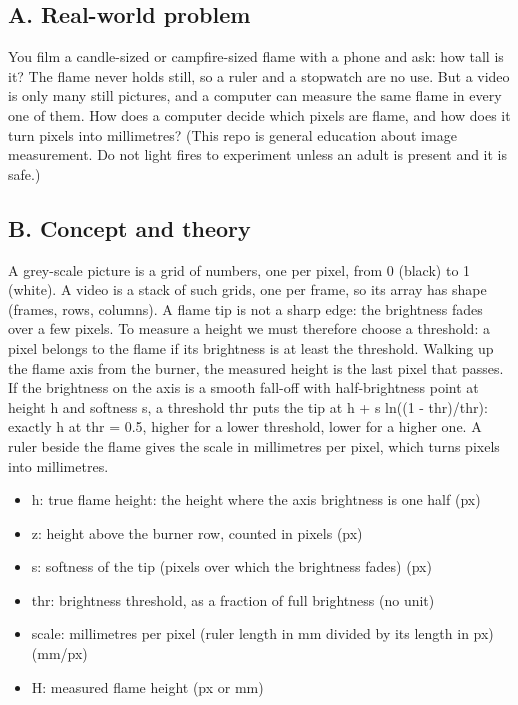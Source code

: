 \documentclass[11pt,a4paper]{article}
\begin{document}
\subsection*{A. Real-world problem}
You film a candle-sized or campfire-sized flame with a phone and ask: how tall is it? The flame never holds still, so a ruler and a stopwatch are no use. But a video is only many still pictures, and a computer can measure the same flame in every one of them. How does a computer decide which pixels are flame, and how does it turn pixels into millimetres? (This repo is general education about image measurement. Do not light fires to experiment unless an adult is present and it is safe.)

\subsection*{B. Concept and theory}
A grey-scale picture is a grid of numbers, one per pixel, from 0 (black) to 1 (white). A video is a stack of such grids, one per frame, so its array has shape (frames, rows, columns). A flame tip is not a sharp edge: the brightness fades over a few pixels. To measure a height we must therefore choose a threshold: a pixel belongs to the flame if its brightness is at least the threshold. Walking up the flame axis from the burner, the measured height is the last pixel that passes. If the brightness on the axis is a smooth fall-off with half-brightness point at height h and softness s, a threshold thr puts the tip at h + s ln((1 - thr)/thr): exactly h at thr = 0.5, higher for a lower threshold, lower for a higher one. A ruler beside the flame gives the scale in millimetres per pixel, which turns pixels into millimetres.

\begin{itemize}[nosep]
\item h: true flame height: the height where the axis brightness is one half (px)
\item z: height above the burner row, counted in pixels (px)
\item s: softness of the tip (pixels over which the brightness fades) (px)
\item thr: brightness threshold, as a fraction of full brightness (no unit)
\item scale: millimetres per pixel (ruler length in mm divided by its length in px) (mm/px)
\item H: measured flame height (px or mm)
\end{itemize}
\end{document}
